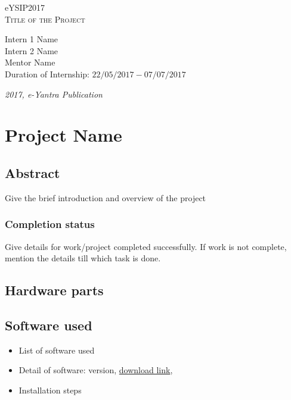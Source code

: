 \documentclass[a4paper,12pt,oneside]{book}
\begin{document}
\begin{titlepage}
\raggedright
{\Large eYSIP2017\\[1cm]}
{\Huge\scshape Title of the Project \\[.1in]}
\vfill
\begin{flushright}
{\large Intern 1 Name \\}
{\large Intern 2 Name \\}
{\large Mentor Name \\}
{\large Duration of Internship: $ 22/05/2017-07/07/2017 $ \\}
\end{flushright}

{\itshape 2017, e-Yantra Publication}
\end{titlepage}

\chapter[Project Tag]{Project Name}
\section*{Abstract}
Give the brief introduction and overview of the project

\subsection*{Completion status}
Give details for work/project completed successfully. If work is not
complete, mention the details till which task is done.

\section{Hardware parts}

\section{Software used}
\begin{itemize}
  \item List of software used 
  \item Detail of software: version, \href{http://www.amazon.com}{download link}, 
  \item Installation steps
\end{itemize}
\end{document}
